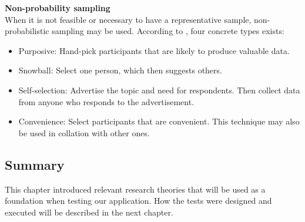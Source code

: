 \textbf{Non-probability sampling} \\
When it is not feasible or necessary to have a representative sample, non-probabilistic sampling may be used. According to \citeauthor{oates_researching_2006}, four concrete types exists:
\begin{itemize}
    \item Purposive: Hand-pick participants that are likely to produce valuable data.
    \item Snowball: Select one person, which then suggests others.
    \item Self-selection: Advertise the topic and need for respondents. Then collect data from anyone who responds to the advertisement.
    \item Convenience: Select participants that are convenient. This technique may also be used in collation with other ones.
\end{itemize}

\subsection{Summary}
This chapter introduced relevant research theories that will be used as a foundation when testing our application. How the tests were designed and executed will be described in the next chapter.